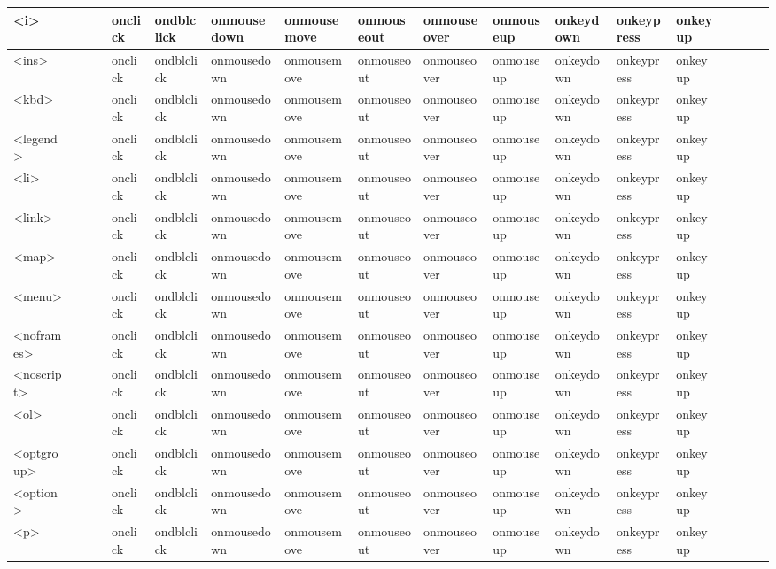 \begin{longtable}{|p{18pt}|p{15pt}|p{15pt}|p{10pt}|p{16pt}|p{16pt}|p{16pt}|p{16pt}|p{16pt}|p{16pt}|p{16pt}|p{16pt}|p{16pt}|p{16pt}|p{16pt}|p{16pt}|p{16pt}|p{16pt}|}
\hline
<i>			&	&	&	& onclick	& ondblclick & onmousedown & onmousemove & onmouseout & onmouseover & onmouseup & onkeydown & onkeypress & onkeyup & & & & \\
\hline
<ins>		&	&	&	& onclick	& ondblclick & onmousedown & onmousemove & onmouseout & onmouseover & onmouseup & onkeydown & onkeypress & onkeyup & & & & \\
\hline
<kbd>		&	&	&	& onclick	& ondblclick & onmousedown & onmousemove & onmouseout & onmouseover & onmouseup & onkeydown & onkeypress & onkeyup & & & & \\
\hline
<legend>		&	&	&	& onclick	& ondblclick & onmousedown & onmousemove & onmouseout & onmouseover & onmouseup & onkeydown & onkeypress & onkeyup & & & & \\
\hline
<li>			&	&	&	& onclick	& ondblclick & onmousedown & onmousemove & onmouseout & onmouseover & onmouseup & onkeydown & onkeypress & onkeyup & & & & \\
\hline
<link>		&	&	&	& onclick	& ondblclick & onmousedown & onmousemove & onmouseout & onmouseover & onmouseup & onkeydown & onkeypress & onkeyup & & & & \\
\hline
<map>		&	&	&	& onclick	& ondblclick & onmousedown & onmousemove & onmouseout & onmouseover & onmouseup & onkeydown & onkeypress & onkeyup & & & & \\
\hline
<menu>		&	&	&	& onclick	& ondblclick & onmousedown & onmousemove & onmouseout & onmouseover & onmouseup & onkeydown & onkeypress & onkeyup & & & & \\
\hline
<noframes>	&	&	&	& onclick	& ondblclick & onmousedown & onmousemove & onmouseout & onmouseover & onmouseup & onkeydown & onkeypress & onkeyup & & & & \\
\hline
<noscript>	&	&	&	& onclick	& ondblclick & onmousedown & onmousemove & onmouseout & onmouseover & onmouseup & onkeydown & onkeypress & onkeyup & & & & \\
\hline
<ol>			&	&	&	& onclick	& ondblclick & onmousedown & onmousemove & onmouseout & onmouseover & onmouseup & onkeydown & onkeypress & onkeyup & & & & \\
\hline
<optgroup>	&	&	&	& onclick	& ondblclick & onmousedown & onmousemove & onmouseout & onmouseover & onmouseup & onkeydown & onkeypress & onkeyup & & & & \\
\hline
<option>		&	&	&	& onclick	& ondblclick & onmousedown & onmousemove & onmouseout & onmouseover & onmouseup & onkeydown & onkeypress & onkeyup & & & & \\
\hline
<p>			&	&	&	& onclick	& ondblclick & onmousedown & onmousemove & onmouseout & onmouseover & onmouseup & onkeydown & onkeypress & onkeyup & & & & \\

\end{longtable}
